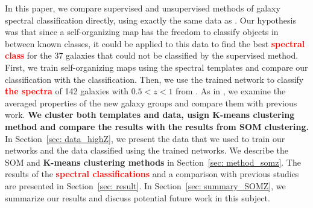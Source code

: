 In this paper, we compare supervised and unsupervised methods of galaxy spectral classification directly, using exactly the same data as .  
Our hypothesis was that since a self-organizing map has the freedom to classify objects in between known classes, it could be applied to this data 
to find the best \textbf{\textcolor{red}{spectral class}} for the 37 galaxies that could not be classified by the supervised method.
First, we train self-organizing maps using the  spectral templates and compare our classification with the  classification.
Then, we use the trained network to classify \textbf{\textcolor{red}{the spectra}} of 142 galaxies with $0.5 < z < 1$ from . 
As in , we examine the averaged properties of the new galaxy groups and compare them with previous work.
\textbf{We cluster both  templates and  data, usign K-means clustering method and compare the results with the results from SOM clustering.}
In Section~\ref{sec: data_highZ}, we present the data that we used to train our networks and the data classified using the trained networks. 
We describe the SOM and \textbf{K-means clustering methods} in Section~\ref{sec: method_somz}. 
The results of the \textbf{\textcolor{red}{spectral classifications}} and a comparison with previous studies are presented in Section~\ref{sec: result}. 
In Section~\ref{sec: summary_SOMZ}, we summarize our results and discuss potential future work in this subject.